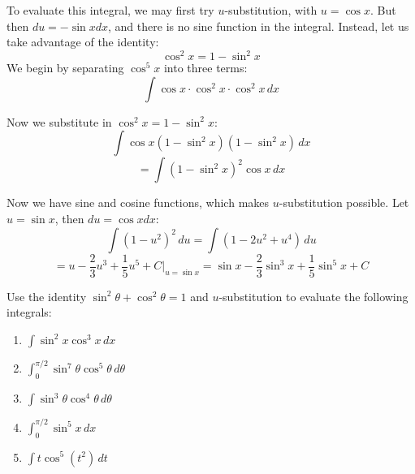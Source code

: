 To evaluate this integral, we may first try $u$-substitution, with $u = \cos{x}
$. But then $du = -\sin{x} dx$, and there is no sine function in the integral. 
Instead, let us take advantage of the identity:
$$\cos^2{x} = 1 - \sin^2{x}$$
We begin by separating $\cos^5{x}$ into three terms:
$$\int \cos{x} \cdot \cos^2{x} \cdot \cos^2{x}\,dx$$

Now we substitute in $\cos^2{x} = 1 - \sin^2{x}$:
$$\int \cos{x} \left( 1 - \sin^2{x} \right) \left( 1 - \sin^2{x} \right)\,dx$$
$$= \int \left( 1 - \sin^2{x} \right)^2 \cos{x} \,dx$$

Now we have sine and cosine functions, which makes $u$-substitution possible. 
Let $u = \sin{x}$, then $du = \cos{x} dx$:
$$\int \left( 1 - u^2 \right)^2\,du = \int \left( 1 - 2u^2 + u^4 \right)\,du$$
$$= u - \frac{2}{3}u^3 + \frac{1}{5}u^5 + C|_{u = \sin{x}} = \sin{x} - \frac{
2}{3}\sin^3{x} + \frac{1}{5}\sin^5{x} + C$$

\begin{Exercise}[title = {Integrating odd powers of sine and cosine}, 
label = power_1]
Use the identity $\sin^2{\theta} + \cos^2{\theta} = 1$ and $u$-substitution to 
evaluate the following integrals:
\begin{enumerate}
\item $\int \sin^2{x} \cos^3{x}\,dx$
\item $\int_0^{\pi/2} \sin^7{\theta} \cos^5{\theta}\,d\theta$
\item $\int \sin^3{\theta} \cos^4{\theta}\,d\theta$
\item $\int_0^{\pi/2} \sin^5{x}\,dx$
\item $\int t \cos^5{\left( t^2 \right)}\,dt$
\end{enumerate}
\end{Exercise}

